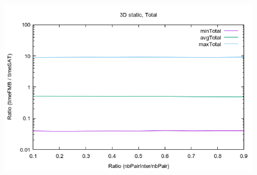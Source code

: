 \documentclass[12pt, a4paper]{article}
\begin{document}
\begin{scriptsize}
\begin{ttfamily}

\end{ttfamily}
\end{scriptsize}

\begin{center}
\begin{figure}[H]
\centering\includegraphics[width=12cm]{../Results/qualification3D.png}\\
\end{figure}
\end{center}
\end{document}
